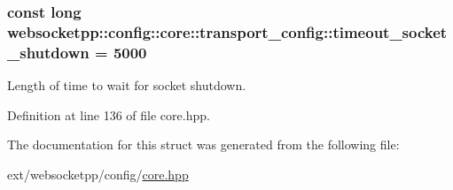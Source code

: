 \subsubsection[{timeout\+\_\+socket\+\_\+shutdown}]{\setlength{\rightskip}{0pt plus 5cm}const long websocketpp\+::config\+::core\+::transport\+\_\+config\+::timeout\+\_\+socket\+\_\+shutdown = 5000\hspace{0.3cm}{\ttfamily [static]}}\label{structwebsocketpp_1_1config_1_1core_1_1transport__config_a185b7787fb2ee6bdf8ae5391926b1665}


Length of time to wait for socket shutdown. 



Definition at line 136 of file core.\+hpp.



The documentation for this struct was generated from the following file\+:\begin{DoxyCompactItemize}
\item 
ext/websocketpp/config/\hyperlink{core_8hpp}{core.\+hpp}\end{DoxyCompactItemize}
